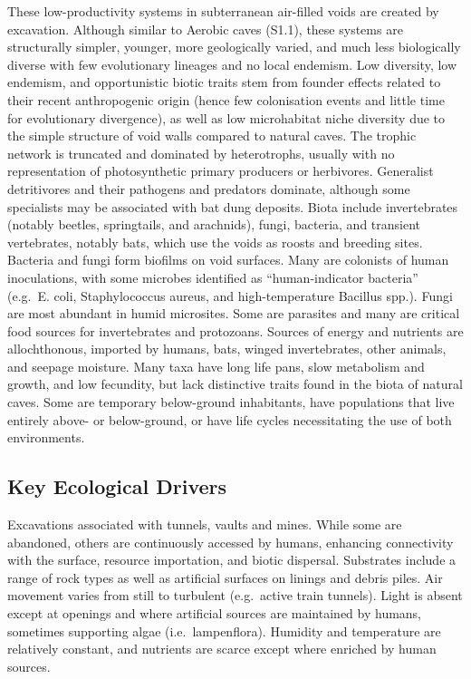 \documentclass[
  letterpaper,
  DIV=11,
  numbers=noendperiod]{scrartcl}
\begin{document}
These low-productivity systems in subterranean air-filled voids are
created by excavation. Although similar to Aerobic caves (S1.1), these
systems are structurally simpler, younger, more geologically varied, and
much less biologically diverse with few evolutionary lineages and no
local endemism. Low diversity, low endemism, and opportunistic biotic
traits stem from founder effects related to their recent anthropogenic
origin (hence few colonisation events and little time for evolutionary
divergence), as well as low microhabitat niche diversity due to the
simple structure of void walls compared to natural caves. The trophic
network is truncated and dominated by heterotrophs, usually with no
representation of photosynthetic primary producers or herbivores.
Generalist detritivores and their pathogens and predators dominate,
although some specialists may be associated with bat dung deposits.
Biota include invertebrates (notably beetles, springtails, and
arachnids), fungi, bacteria, and transient vertebrates, notably bats,
which use the voids as roosts and breeding sites. Bacteria and fungi
form biofilms on void surfaces. Many are colonists of human
inoculations, with some microbes identified as ``human-indicator
bacteria'' (e.g.~E. coli, Staphylococcus aureus, and high-temperature
Bacillus spp.). Fungi are most abundant in humid microsites. Some are
parasites and many are critical food sources for invertebrates and
protozoans. Sources of energy and nutrients are allochthonous, imported
by humans, bats, winged invertebrates, other animals, and seepage
moisture. Many taxa have long life pans, slow metabolism and growth, and
low fecundity, but lack distinctive traits found in the biota of natural
caves. Some are temporary below-ground inhabitants, have populations
that live entirely above- or below-ground, or have life cycles
necessitating the use of both environments.

\subsection{Key Ecological Drivers}\label{key-ecological-drivers-61}

Excavations associated with tunnels, vaults and mines. While some are
abandoned, others are continuously accessed by humans, enhancing
connectivity with the surface, resource importation, and biotic
dispersal. Substrates include a range of rock types as well as
artificial surfaces on linings and debris piles. Air movement varies
from still to turbulent (e.g.~active train tunnels). Light is absent
except at openings and where artificial sources are maintained by
humans, sometimes supporting algae (i.e.~lampenflora). Humidity and
temperature are relatively constant, and nutrients are scarce except
where enriched by human sources.
\end{document}
